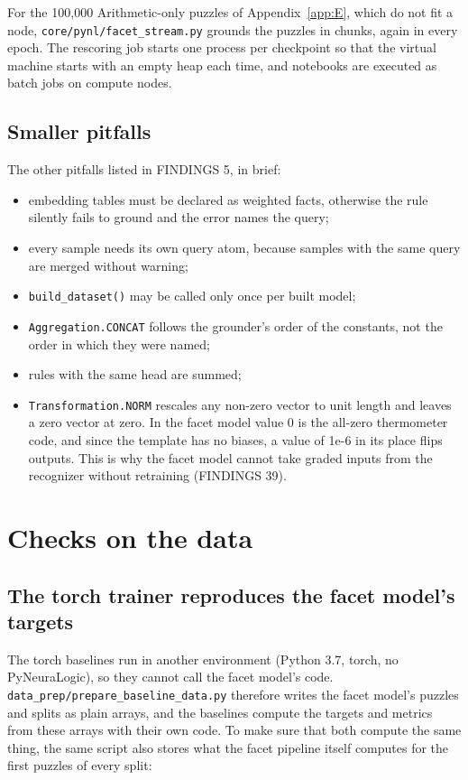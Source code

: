 For the 100,000 Arithmetic-only puzzles of Appendix~\ref{app:E}, which do not fit a node, \texttt{core/pynl/facet\_stream.py} grounds the puzzles in chunks, again in every epoch. The rescoring job starts one process per checkpoint so that the virtual machine starts with an empty heap each time, and notebooks are executed as batch jobs on compute nodes.

\section{Smaller pitfalls}\label{sec:A.6}

The other pitfalls listed in FINDINGS 5, in brief:

\begin{itemize}
\item embedding tables must be declared as weighted facts, otherwise the rule silently fails to ground and the error names the query;
\item every sample needs its own query atom, because samples with the same query are merged without warning;
\item \texttt{build\_dataset()} may be called only once per built model;
\item \texttt{Aggregation.CONCAT} follows the grounder's order of the constants, not the order in which they were named;
\item rules with the same head are summed;
\item \texttt{Transformation.NORM} rescales any non-zero vector to unit length and leaves a zero vector at zero. In the facet model value 0 is the all-zero thermometer code, and since the template has no biases, a value of 1e-6 in its place flips outputs. This is why the facet model cannot take graded inputs from the recognizer without retraining (FINDINGS 39).
\end{itemize}

\chapter{Checks on the data}\label{app:B}

\section{The torch trainer reproduces the facet model's targets}\label{sec:B.1}

The torch baselines run in another environment (Python 3.7, torch, no PyNeuraLogic), so they cannot call the facet model's code. \texttt{data\_prep/prepare\_baseline\_data.py} therefore writes the facet model's puzzles and splits as plain arrays, and the baselines compute the targets and metrics from these arrays with their own code. To make sure that both compute the same thing, the same script also stores what the facet pipeline itself computes for the first puzzles of every split:

